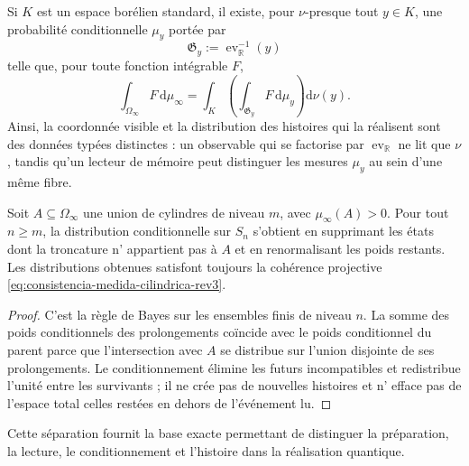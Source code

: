 \begin{proposition}
\label{prop:desintegracion-valores-genealogicos-rev3}
Si \(K\) est un espace borélien standard, il existe, pour \(\nu\)-presque tout
\(y\in K\), une probabilité conditionnelle \(\mu_y\) portée par
\[
 \mathfrak G_y:=\operatorname{ev}_{\mathbb R}^{-1}(y)
\]
telle que, pour toute fonction intégrable \(F\),
\begin{equation}
 \int_{\Omega_\infty}F\,\mathrm d\mu_\infty
 =\int_K
   \left(\int_{\mathfrak G_y}F\,\mathrm d\mu_y\right)
   \mathrm d\nu(y).
 \label{eq:desintegracion-fibras-visibles-rev3}
\end{equation}
Ainsi, la coordonnée visible et la distribution des histoires qui la réalisent
sont des données typées distinctes : un observable qui se factorise par
\(\operatorname{ev}_{\mathbb R}\) ne lit que \(\nu\), tandis qu'un lecteur de
mémoire peut distinguer les mesures \(\mu_y\) au sein d'une même fibre.
\end{proposition}

\begin{proposition}
\label{prop:condicionamiento-cilindrico-compatible-rev3}
Soit \(A\subseteq\Omega_\infty\) une union de cylindres de niveau \(m\), avec
\(\mu_\infty(A)>0\). Pour tout \(n\geq m\), la distribution conditionnelle
sur \(S_n\) s'obtient en supprimant les états dont la troncature n'
appartient pas à \(A\) et en renormalisant les poids restants. Les distributions
obtenues satisfont toujours la cohérence projective
\eqref{eq:consistencia-medida-cilindrica-rev3}.
\end{proposition}

\begin{proof}
C'est la règle de Bayes sur les ensembles finis de niveau \(n\). La somme des
poids conditionnels des prolongements coïncide avec le poids conditionnel du
parent parce que l'intersection avec \(A\) se distribue sur l'union disjointe de
ses prolongements. Le conditionnement élimine les futurs incompatibles et
redistribue l'unité entre les survivants ; il ne crée pas de nouvelles histoires et n'
efface pas de l'espace total celles restées en dehors de l'événement lu.
\end{proof}

Cette séparation fournit la base exacte permettant de distinguer la préparation,
la lecture, le conditionnement et l'histoire dans la réalisation quantique.


